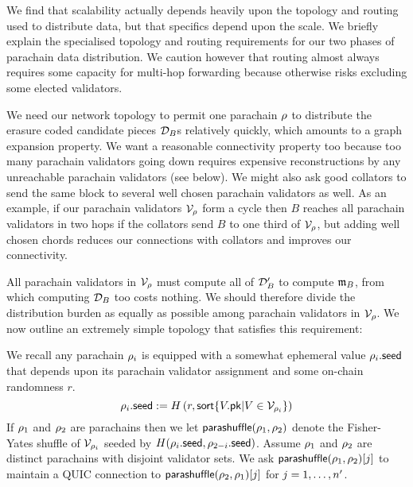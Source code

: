 We find that scalability actually depends heavily upon the topology and routing used to distribute data, but that specifics depend upon the scale.  We briefly explain the specialised topology and routing requirements for our two phases of parachain data distribution.  We caution however that routing almost always requires some capacity for multi-hop forwarding because otherwise risks excluding some elected validators.  

\smallskip

We need our network topology to permit one parachain $\rho$ to distribute the erasure coded candidate pieces $\mathcal{D}_B$s relatively quickly, which amounts to a graph expansion property.  We want a reasonable connectivity property too because too many parachain validators going down requires expensive reconstructions by any unreachable parachain validators (see  below).  We might also ask good collators to send the same block to several well chosen parachain validators as well.  As an example, if our parachain validators $\mathcal{V}_{\rho}$ form a cycle then $B$ reaches all parachain validators in two hops if the collators send $B$ to one third of $\mathcal{V}_{\rho}$, but adding well chosen chords reduces our connections with collators and improves our connectivity.  

\smallskip

All parachain validators in $\mathcal{V}_{\rho}$ must compute all of $\mathcal{D}'_B$ to compute $\mathfrak{m}_B$, from which computing $\mathcal{D}_B$ too costs nothing.  We should therefore divide the distribution burden as equally as possible among parachain validators in $\mathcal{V}_{\rho}$.  We now outline an extremely simple topology that satisfies this requirement:

We recall any parachain $\rho_i$ is equipped with a somewhat ephemeral value $\rho_i.\mathsf{seed}$ that depends upon its parachain validator assignment and some on-chain randomness $r$.
$$ \rho_i.\mathsf{seed} := H\left( r, \mathsf{sort} \{  V.\mathsf{pk}  |  V \in \mathcal{V}_{\rho_i}  \} \right) $$
If $\rho_1$ and $\rho_2$ are parachains then we let $\mathsf{parashuffle}(\rho_1,\rho_2)$ denote the Fisher-Yates shuffle of $\mathcal{V}_{\rho_i}$ seeded by $H( \rho_i.\mathsf{seed}, \rho_{2-i}.\mathsf{seed} )$.  Assume $\rho_1$ and $\rho_2$ are distinct parachains with disjoint validator sets.  We ask $\mathsf{parashuffle}(\rho_1,\rho_2)[j]$ to maintain a QUIC connection to $\mathsf{parashuffle}(\rho_2,\rho_1)[j]$ for $j = 1,\ldots,n'$.  

